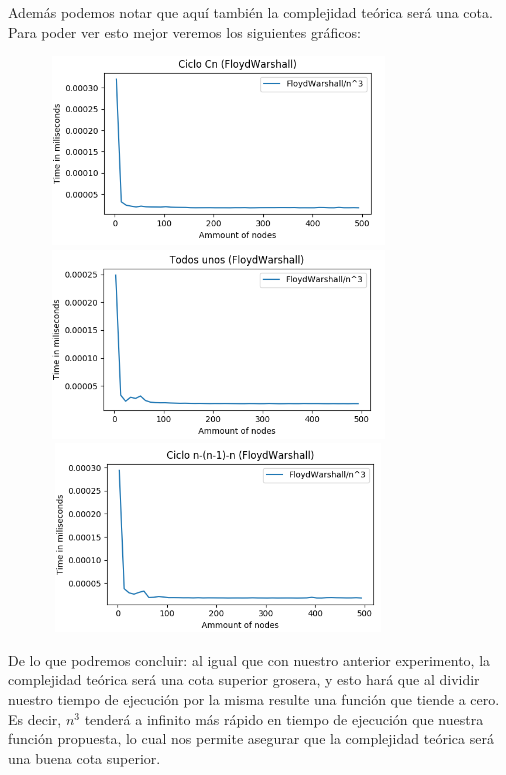 \documentclass[11pt,a4paper]{article}
\begin{document}
Adem\'as podemos notar que aqu\'i tambi\'en la complejidad te\'orica ser\'a una cota. Para poder ver esto mejor veremos los siguientes gr\'aficos:

 \begin{figure}[h]
     \includegraphics[height = 5cm,width = 9cm]{F-W3cn.png}
     \includegraphics[height = 5cm,width = 9cm]{F-W3unos.png}
     \includegraphics[height = 5cm,width = 9cm]{FW3-nnl1n.png}
 \end{figure}
 \pagebreak
 
 De lo que podremos concluir: al igual que con nuestro anterior experimento, la complejidad te\'orica ser\'a una cota superior grosera, y esto har\'a que al dividir nuestro tiempo de ejecuci\'on por la misma resulte una funci\'on que tiende a cero. Es decir, $n^{3}$ tender\'a a infinito m\'as r\'apido en tiempo de ejecuci\'on que nuestra funci\'on propuesta, lo cual nos permite asegurar que la complejidad te\'orica ser\'a una buena cota superior.
\end{document}
